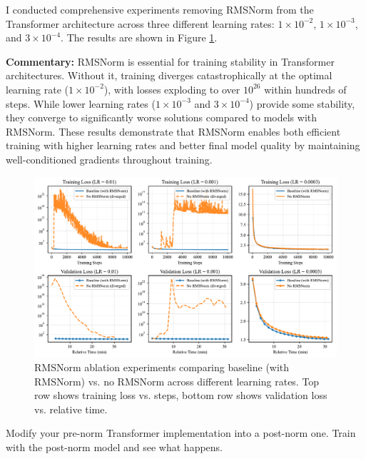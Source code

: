 \begin{answer}

I conducted comprehensive experiments removing RMSNorm from the Transformer architecture across three different learning rates: $1 \times 10^{-2}$, $1 \times 10^{-3}$, and $3 \times 10^{-4}$. The results are shown in Figure \ref{fig:rmsnorm_ablation_experiments}.

\textbf{Commentary:} RMSNorm is essential for training stability in Transformer architectures. Without it, training diverges catastrophically at the optimal learning rate ($1 \times 10^{-2}$), with losses exploding to over $10^{26}$ within hundreds of steps. While lower learning rates ($1 \times 10^{-3}$ and $3 \times 10^{-4}$) provide some stability, they converge to significantly worse solutions compared to models with RMSNorm. These results demonstrate that RMSNorm enables both efficient training with higher learning rates and better final model quality by maintaining well-conditioned gradients throughout training.

\begin{figure}[H]
    \centering
    \includegraphics[width=\textwidth]{images/rmsnorm_ablation_experiments.pdf}
    \caption{RMSNorm ablation experiments comparing baseline (with RMSNorm) vs. no RMSNorm across different learning rates. Top row shows training loss vs. steps, bottom row shows validation loss vs. relative time.}
    \label{fig:rmsnorm_ablation_experiments}
\end{figure}

\end{answer}


Modify your pre-norm Transformer implementation into a post-norm one. Train with the post-norm model and see what happens.

